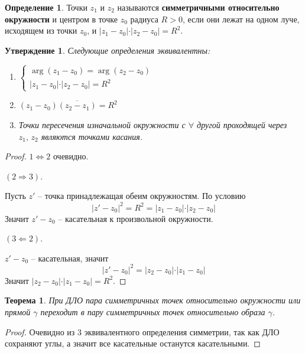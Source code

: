 \documentclass[a4paper,12pt]{article}
\theoremstyle{plain}
\newtheorem{theorem}{Теорема}[section]
\newtheorem{proposition}{Утверждение}[section]
\theoremstyle{definition}
\newtheorem{definition}{Определение}[section]
\theoremstyle{remark}
\begin{document}
\begin{definition}
	Точки $z_1$ и $z_2$ называются \textbf{симметричными относительно окружности} и центром в точке $z_0$ радиуса $R > 0$, если они лежат на одном луче, исходящем из точки $z_0$, и $\vert z_1 - z_0\vert\cdot\vert z_2 - z_0\vert = R^2$.
\end{definition}

\begin{proposition}
	Следующие определения эквивалентны:
	\begin{enumerate}
		\item $\begin{cases}
				      \arg(z_1 - z_0) = \arg(z_2 - z_0) \\
				      \vert z_1 - z_0\vert\cdot\vert z_2 - z_0\vert = R^2
			      \end{cases}$
		\item $(z_1 - z_0)\overline{(z_2 - z_1)} = R^2$
		\item Точки пересечения изначальной окружности с $\forall$ другой проходящей через $z_1,\, z_2$ являются точками касания.
	\end{enumerate}
\end{proposition}

\begin{proof}
	$1 \Leftrightarrow 2$ очевидно.

	$(2 \Rightarrow 3)$.

	Пусть $z'$ -- точка принадлежащая обеим окружностям. По условию
	\[
		\vert z' - z_0\vert^2 = R^2 = \vert z_1 - z_0	\vert\cdot\vert z_2 - z_0\vert
	\]
	Значит $z' - z_0$ -- касательная к произвольной окружности.

	$(3 \Leftarrow 2)$.

	$z' - z_0$ -- касательная, значит
	\[
		\vert z' - z_0\vert^2 = \vert z_2 - z_0\vert\cdot\vert z_1 - z_0\vert
	\]
	Значит $\vert z_2 - z_0\vert\cdot\vert z_1 - z_0\vert = R^2$.
\end{proof}

\begin{theorem}
	При ДЛО пара симметричных точек относительно окружности или прямой $\gamma$ переходит в пару симметричных точек относительно образа $\gamma$.
\end{theorem}

\begin{proof}
	Очевидно из 3 эквивалентного определения симметрии, так как ДЛО сохраняют углы, а значит все касательные останутся касательными.
\end{proof}
\end{document}
